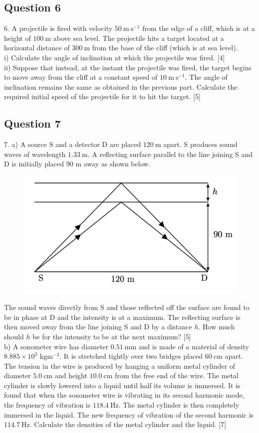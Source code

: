 \documentclass{article}
\begin{document}
\subsection{Question 6}
6. A projectile is fired with velocity $50 \mathrm{~m} \mathrm{~s}^{-1}$ from the edge of a cliff, which is at a height of $100 \mathrm{~m}$ above sea level. The projectile hits a target located at a horizontal distance of $300 \mathrm{~m}$ from the base of the cliff (which is at sea level). \\
i) Calculate the angle of inclination at which the projectile was fired. [4] \\
ii) Suppose that instead, at the instant the projectile was fired, the target begins to move away from the cliff at a constant speed of $10 \mathrm{~m} \mathrm{~s}^{-1}$. The angle of inclination remains the same as obtained in the previous part. Calculate the required initial speed of the projectile for it to hit the target. [5]

\subsection{Question 7}
7. a) A source $\mathrm{S}$ and a detector $\mathrm{D}$ are placed $120 \mathrm{~m}$ apart. S produces sound waves of wavelength $1.33 \mathrm{~m}$. A reflecting surface parallel to the line joining S and D is initially placed 90 $\mathrm{m}$ away as shown below.

\begin{figure}
	\centering
	\includegraphics[width=0.5\linewidth]{spho_book_TYS_images/2019q7.png}
	\caption{}
\end{figure}

The sound waves directly from $\mathrm{S}$ and those reflected off the surface are found to be in phase at $\mathrm{D}$ and the intensity is at a maximum. The reflecting surface is then moved away from the line joining S and D by a distance $h$. How much should $h$ be for the intensity to be at the next maximum? [5] \\ 
b) A sonometer wire has diameter $0.51 \mathrm{~mm}$ and is made of a material of density $8.885 \times 10^{3}$ $\mathrm{kg} \mathrm{m}^{-3}$. It is stretched tightly over two bridges placed $60 \mathrm{~cm}$ apart. The tension in the wire is produced by hanging a uniform metal cylinder of diameter $5.0 \mathrm{~cm}$ and height $10.0 \mathrm{~cm}$ from the free end of the wire. The metal cylinder is slowly lowered into a liquid until half its volume is immersed. It is found that when the sonometer wire is vibrating in its second harmonic mode, the frequency of vibration is $118.4 \mathrm{~Hz}$. The metal cylinder is then completely immersed in the liquid. The new frequency of vibration of the second harmonic is $114.7 \mathrm{~Hz}$. Calculate the densities of the metal cylinder and the liquid. [7]
\end{document}
